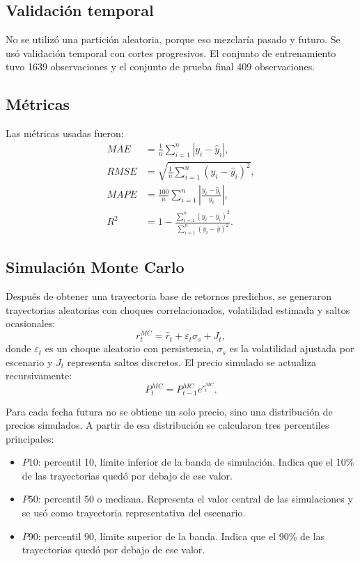 \documentclass[12pt,letterpaper]{article}
\begin{document}
\subsection{Validación temporal}
No se utilizó una partición aleatoria, porque eso mezclaría pasado y futuro. Se usó validación temporal con cortes progresivos. El conjunto de entrenamiento tuvo 1639 observaciones y el conjunto de prueba final 409 observaciones.

\subsection{Métricas}
Las métricas usadas fueron:
\begin{align}
MAE &= \frac{1}{n}\sum_{i=1}^{n}|y_i-\hat{y}_i|,\\
RMSE &= \sqrt{\frac{1}{n}\sum_{i=1}^{n}(y_i-\hat{y}_i)^2},\\
MAPE &= \frac{100}{n}\sum_{i=1}^{n}\left|\frac{y_i-\hat{y}_i}{y_i}\right|,\\
R^2 &= 1-\frac{\sum_{i=1}^{n}(y_i-\hat{y}_i)^2}{\sum_{i=1}^{n}(y_i-\bar{y})^2}.
\end{align}

\subsection{Simulación Monte Carlo}
Después de obtener una trayectoria base de retornos predichos, se generaron trayectorias aleatorias con choques correlacionados, volatilidad estimada y saltos ocasionales:
\begin{equation}
r_t^{MC}=\hat{r}_t+\varepsilon_t\sigma_s+J_t,
\end{equation}
donde $\varepsilon_t$ es un choque aleatorio con persistencia, $\sigma_s$ es la volatilidad ajustada por escenario y $J_t$ representa saltos discretos. El precio simulado se actualiza recursivamente:
\begin{equation}
P_t^{MC}=P_{t-1}^{MC}e^{r_t^{MC}}.
\end{equation}

Para cada fecha futura no se obtiene un solo precio, sino una distribución de precios simulados. A partir de esa distribución se calcularon tres percentiles principales:
\begin{itemize}
    \item $P10$: percentil 10, límite inferior de la banda de simulación. Indica que el 10\% de las trayectorias quedó por debajo de ese valor.
    \item $P50$: percentil 50 o mediana. Representa el valor central de las simulaciones y se usó como trayectoria representativa del escenario.
    \item $P90$: percentil 90, límite superior de la banda. Indica que el 90\% de las trayectorias quedó por debajo de ese valor.
\end{itemize}
\end{document}
